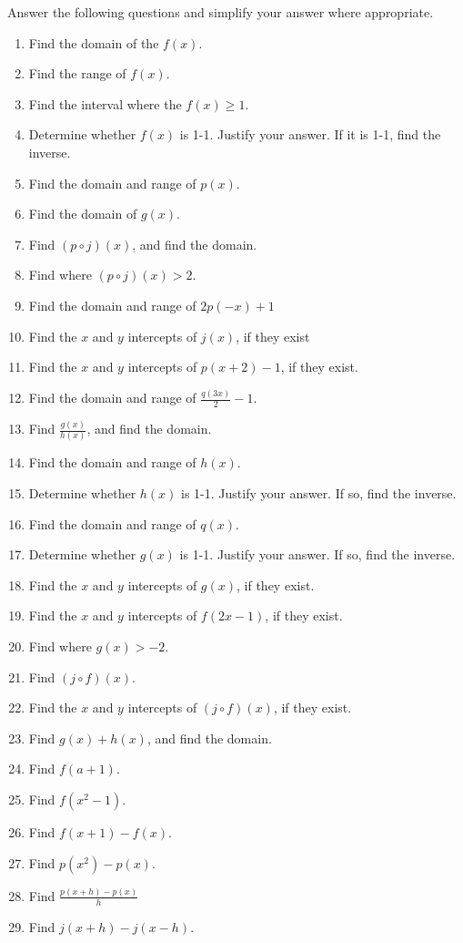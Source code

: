 \documentclass{ximera}
\begin{document}
\begin{enumerate}
Answer the following questions and simplify your answer where appropriate.
\begin{enumerate}
\item Find the domain of the $f(x)$. 
\item Find the range of $f(x)$. 
\item Find the interval where the $f(x)\geq1$.
\item Determine whether $f(x)$ is 1-1. Justify your answer. If it is 1-1, find the inverse. 
\item Find the domain and range of $p(x)$. 
\item Find the domain of $g(x)$. 
\item Find $(p\circ j)(x)$, and find the domain.   
\item Find where $(p\circ j)(x)>2$.
\item Find the domain and range of $2p(-x)+1$
\item Find the $x$ and $y$ intercepts of $j(x)$, if they exist 
\item Find the $x$ and $y$ intercepts of $p(x+2)-1$, if they exist.
\item Find the domain and range of $\displaystyle \frac{q(3x)}{2}-1$.
\item Find $\displaystyle \frac{g(x)}{h(x)}$, and find the domain. 
\item Find the domain and range of $h(x)$. 
\item Determine whether $h(x)$ is 1-1. Justify your answer. If so, find the inverse. 
\item Find the domain and range of $q(x)$. 
\item Determine whether $g(x)$ is 1-1. Justify your answer. If so, find the inverse. 
\item Find the $x$ and $y$ intercepts of $g(x)$, if they exist.
\item Find the $x$ and $y$ intercepts of $f(2x-1)$, if they exist. 
\item Find where $g(x)>-2$. 
\item Find $(j\circ f)(x)$. 
\item Find the $x$ and $y$ intercepts of $(j\circ f)(x)$, if they exist. 
\item Find $g(x)+h(x)$, and find the domain.
\item Find $f(a+1)$.
\item Find $f(x^2-1)$.
\item Find $f(x+1)-f(x)$.
\item Find $p(x^2)-p(x)$.
\item Find $\displaystyle \frac{p(x+h)-p(x)}{h}$
\item Find $\displaystyle j(x+h)-j(x-h)$.
\end{enumerate}



\end{enumerate}
\end{document}
